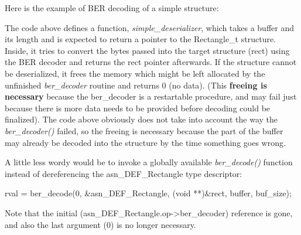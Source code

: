 \documentclass[english,oneside,12pt]{book}
\begin{document}
Here is the example of BER decoding of a simple structure:


The code above defines a function, \emph{simple\_deserializer}, which
takes a buffer and its length and is expected to return a pointer
to the Rectangle\_t structure. Inside, it tries to convert the bytes
passed into the target structure (rect) using the BER decoder and
returns the rect pointer afterwards. If the structure cannot be deserialized,
it frees the memory which might be left allocated by the unfinished
\emph{ber\_decoder} routine and returns 0 (no data). (This \textbf{freeing
is necessary} because the ber\_decoder is a restartable procedure,
and may fail just because there is more data needs to be provided
before decoding could be finalized). The code above obviously does
not take into account the way the \emph{ber\_decoder()} failed, so
the freeing is necessary because the part of the buffer may already
be decoded into the structure by the time something goes wrong.

A little less wordy would be to invoke a globally available \emph{ber\_decode()}
function instead of dereferencing the asn\_DEF\_Rectangle type descriptor:
\begin{codesample}
rval = ber_decode(0, &asn_DEF_Rectangle, (void **)&rect, buffer, buf_size);
\end{codesample}
Note that the initial (asn\_DEF\_Rectangle.op->ber\_decoder) reference
is gone, and also the last argument (0) is no longer necessary.
\end{document}

